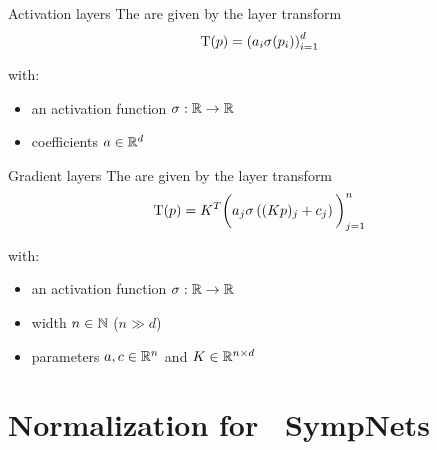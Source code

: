 \begin{frame}[c]{Activation layers}
  The  are given by the layer transform
  \begin{equation*}
    \mathrm{T}(p) = \left( a_i \sigma(p_i) \right)_{i=1}^d
  \end{equation*}

  with:
  \begin{itemize}
    \item an activation function $\sigma : \mathbb{R} \to \mathbb{R}$
    \item coefficients $a \in \mathbb{R}^d$ 
  \end{itemize}
\end{frame}

\begin{frame}[c]{Gradient layers}
  The  are given by the layer transform
  \begin{equation*}
    \mathrm{T}(p) = K^T \bigg( a_j \sigma \left( (Kp)_j + c_j \right) \bigg)_{j=1}^n
  \end{equation*}

  with:
  \begin{itemize}
    \item an activation function $\sigma : \mathbb{R} \to \mathbb{R}$
    \item width $n \in \mathbb{N}$ ($n \gg d$)
    \item parameters $a,c \in \mathbb{R}^n$ and $K \in \mathbb{R}^{n \times d}$
  \end{itemize}
\end{frame}

\section{Normalization for ~\newline SympNets}

